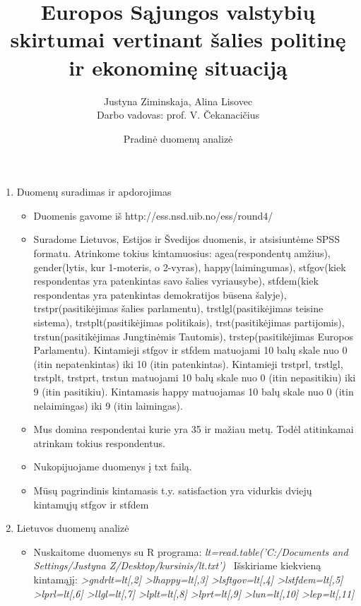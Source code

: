 \documentclass[a4paper]{article}
\title{Europos Sąjungos valstybių skirtumai vertinant šalies politinę ir ekonominę situaciją}
\date{Pradinė duomenų analizė}
\author{Justyna Ziminskaja, Alina Lisovec \\ Darbo vadovas: prof. V. Čekanacičius}
\begin{document}
\maketitle


\begin{enumerate}

\item  Duomenų suradimas ir apdorojimas

\begin{itemize}
\item Duomenis gavome iš http://ess.nsd.uib.no/ess/round4/
\item Suradome Lietuvos, Estijos ir Švedijos duomenis, ir atsisiuntėme SPSS formatu. Atrinkome tokius kintamuosius: agea(respondentų amžius), gender(lytis, kur 1-moteris, o 2-vyras), happy(laimingumas), stfgov(kiek respondentas yra patenkintas savo šalies vyriausybe), stfdem(kiek respondentas yra patenkintas demokratijos būsena šalyje), trstpr(pasitikėjimas šalies parlamentu), trstlgl(pasitikėjimas teisine sistema), trstplt(pasitikėjimas politikais), trst(pasitikėjimas partijomis), trstun(pasitikėjimas Jungtinėmis Tautomis), trstep(pasitikėjimas Europos Parlamentu).
\newline Kintamieji stfgov ir stfdem matuojami 10 balų skale nuo 0 (itin nepatenkintas) iki 10 (itin patenkintas). Kintamieji trstprl, trstlgl, trstplt, trstprt, trstun matuojami 10 balų skale nuo 0 (itin nepasitikiu) iki 9 (itin pasitikiu). Kintamasis happy matuojamas 10 balų skale nuo 0 (itin nelaimingas) iki 9 (itin laimingas).

\item Mus domina respondentai kurie yra 35 ir mažiau metų. Todėl atitinkamai atrinkam tokius respondentus.
\item Nukopijuojame duomenys į txt failą.

\item Mūsų pagrindinis kintamasis t.y. satisfaction yra vidurkis dviejų kintamųjų stfgov ir stfdem

\end{itemize}

\item Lietuvos duomenų analizė

\begin{itemize}
\item Nuskaitome duomenys su R programa: 
\newline
\textit {lt=read.table('C:/Documents and Settings/Justyna Z/Desktop/kursinis/lt.txt')}
\ Išskiriame kiekvieną kintamąjį:
\newline
\textit {>gndrlt=lt[,2] 
\newline >lhappy=lt[,3] 
\newline >lsftgov=lt[,4]
\newline >lstfdem=lt[,5]
\newline >lprl=lt[,6]
\newline >llgl=lt[,7]
\newline >lplt=lt[,8]
\newline >lprt=lt[,9]
\newline >lun=lt[,10]
\newline >lep=lt[,11]}


\end{itemize}
\end{enumerate}
\end{document}
